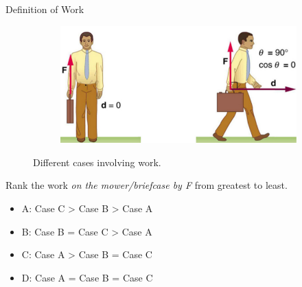 \documentclass{beamer}
\begin{document}
\begin{frame}{Definition of Work}
\begin{figure}
\begin{subfigure}{0.135\textwidth}
\caption{}
\end{subfigure}
\begin{subfigure}{0.2\textwidth}
\centering
\includegraphics[width=\textwidth,trim=12cm 0cm 0cm 0cm,clip=true]{figures/lawn2.png}
\caption{}
\end{subfigure}
\caption{\label{fig:workvisual3} Different cases involving work.}
\end{figure}
\small
Rank the work \textit{on the mower/briefcase by F} from greatest to least.
\begin{itemize}
\item A: Case C > Case B > Case A
\item B: Case B = Case C > Case A
\item C: Case A > Case B = Case C
\item D: Case A = Case B = Case C
\end{itemize}
\end{frame}
\end{document}
